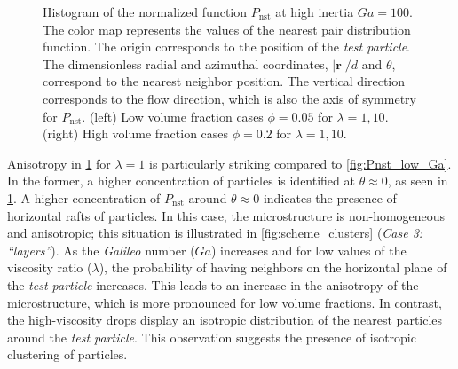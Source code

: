 \documentclass[11pt]{My_preprint}
\providecommand{\DIFadd}[1]{{\protect\color{blue}\uwave{#1}}} %
\providecommand{\DIFdel}[1]{{\protect\color{red}\sout{#1}}}                      %
\providecommand{\DIFaddFL}[1]{\DIFadd{#1}} %
\providecommand{\DIFdelFL}[1]{\DIFdel{#1}} %
\providecommand{\DIFaddbeginFL}{} %
\providecommand{\DIFaddendFL}{} %
\providecommand{\DIFdelbeginFL}{} %
\providecommand{\DIFdelendFL}{} %
\begin{document}
\begin{figure}[h!]
    \DIFaddendFL \caption{Histogram of the normalized function $P_\text{nst}$ at high inertia \DIFdelbeginFL \DIFdelFL{$Ga = 100$}\DIFdelendFL \DIFaddbeginFL \DIFaddFL{$Ga = 80$}\DIFaddendFL .
    The color map represents the values of the nearest pair distribution function. The origin corresponds to the position of the \textit{\textit{test particle}}.
    The dimensionless radial and azimuthal coordinates, $|\textbf{r}|/d$ and $\theta$, correspond to the nearest neighbor position.
    The vertical direction corresponds to the flow direction, which is also the axis of symmetry for $P_\text{nst}$.
    (left) Low volume fraction cases $\phi=0.05$ for $\lambda = 1,10$.
    (right) High volume fraction cases $\phi=0.2$ for $\lambda = 1,10$.}
    \label{fig:Pnst_high_Ga}
\end{figure}
Anisotropy in \ref{fig:Pnst_high_Ga} for $\lambda=1$ is particularly striking compared to \ref{fig:Pnst_low_Ga}. 
In the former, a higher concentration of particles is identified at $\theta \approx 0$, as seen in \ref{fig:Pnst_high_Ga}. 
A higher concentration of $P_\text{nst}$ around $\theta \approx 0$ indicates the presence of horizontal rafts of particles. 
In this case, the microstructure is non-homogeneous and anisotropic; this situation is illustrated in \ref{fig:scheme_clusters} (\textit{Case 3: ``layers''}). 
As the \textit{Galileo} number ($Ga$) increases and for low values of the viscosity ratio ($\lambda$), the probability of having neighbors on the horizontal plane of the \textit{test particle} increases. 
This leads to an increase in the anisotropy of the microstructure, which is more pronounced for low volume fractions. 
In contrast, the high-viscosity drops display an isotropic distribution of the nearest particles around the \textit{test particle}. 
This observation suggests the presence of isotropic clustering of particles.
\end{document}
